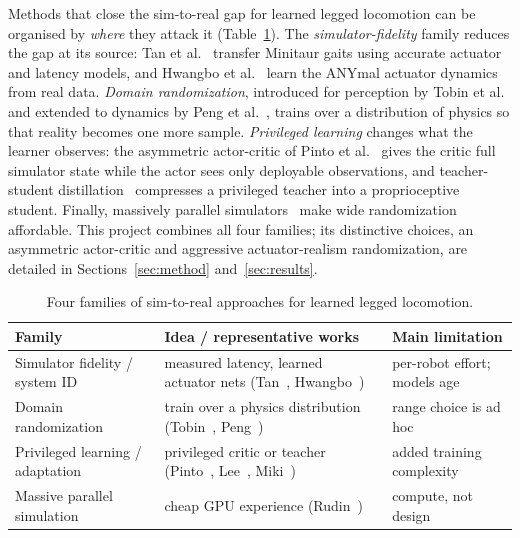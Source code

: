 \documentclass[conference]{IEEEtran}
\begin{document}
Methods that close the sim-to-real gap for learned legged locomotion can be organised by
\emph{where} they attack it (Table~\ref{tab:sota}). The \emph{simulator-fidelity} family reduces
the gap at its source: Tan et al.~\cite{tan2018} transfer Minitaur gaits using accurate actuator
and latency models, and Hwangbo et al.~\cite{hwangbo2019} learn the ANYmal actuator dynamics from
real data. \emph{Domain randomization}, introduced for perception by Tobin et al.~\cite{tobin2017}
and extended to dynamics by Peng et al.~\cite{peng2018}, trains over a distribution of physics so
that reality becomes one more sample. \emph{Privileged learning} changes what the learner
observes: the asymmetric actor-critic of Pinto et al.~\cite{pinto2018} gives the critic full
simulator state while the actor sees only deployable observations, and teacher-student
distillation~\cite{lee2020,miki2022} compresses a privileged teacher into a proprioceptive
student. Finally, massively parallel simulators~\cite{rudin2022} make wide randomization
affordable. This project combines all four families; its distinctive choices, an asymmetric
actor-critic and aggressive actuator-realism randomization, are detailed in
Sections~\ref{sec:method} and~\ref{sec:results}.

\begin{table}[t]
\caption{Four families of sim-to-real approaches for learned legged locomotion.}
\label{tab:sota}
\centering
\footnotesize
\begin{tabular}{p{1.9cm} p{3.3cm} p{2.0cm}}
\toprule
\textbf{Family} & \textbf{Idea / representative works} & \textbf{Main limitation} \\
\midrule
Simulator fidelity / system ID & measured latency, learned actuator nets
(Tan~\cite{tan2018}, Hwangbo~\cite{hwangbo2019}) & per-robot effort; models age \\
\addlinespace
Domain randomization & train over a physics distribution
(Tobin~\cite{tobin2017}, Peng~\cite{peng2018}) & range choice is ad hoc \\
\addlinespace
Privileged learning / adaptation & privileged critic or teacher
(Pinto~\cite{pinto2018}, Lee~\cite{lee2020}, Miki~\cite{miki2022}) & added training complexity \\
\addlinespace
Massive parallel simulation & cheap GPU experience
(Rudin~\cite{rudin2022}) & compute, not design \\
\bottomrule
\end{tabular}
\end{table}
\end{document}
